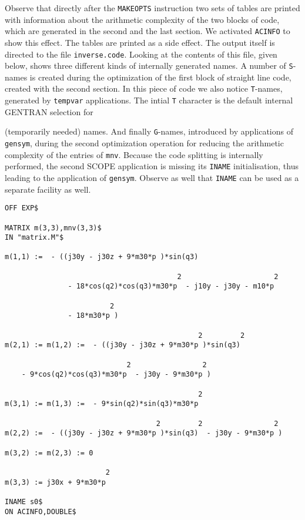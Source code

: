 Observe that directly after the {\tt MAKEOPTS} instruction two sets of tables
are printed with information about the arithmetic complexity of the two blocks 
of code, which are generated in the second and the last section.  We 
activated {\tt ACINFO} to show this effect.  The tables are printed as 
a side effect. The output itself is directed to the file {\tt inverse.code}.
Looking at the contents of this file, given below, shows three different 
kinds of internally generated names. A number of {\tt S}-names is created 
during the optimization of the first block of straight line code, created with
the second section. In this piece of code we also notice {\tt T}-names,
generated by {\tt tempvar} applications. The intial {\tt T} character is the
default internal GENTRAN selection for {(temporarily needed) names.
And finally {\tt G}-names, introduced by
applications of {\tt gensym}, during the second optimization operation for
reducing the arithmetic complexity of the entries of {\tt mnv}. Because the
code splitting is internally performed, the second SCOPE application 
is missing its {\tt INAME} initialisation, thus leading to the application of
{\tt gensym}. Observe as well that {\tt INAME} can be used as a separate 
facility as well.  
{\small
\begin{verbatim}
OFF EXP$

MATRIX m(3,3),mnv(3,3)$
IN "matrix.M"$

m(1,1) :=  - ((j30y - j30z + 9*m30*p )*sin(q3)

                                         2                      2
               - 18*cos(q2)*cos(q3)*m30*p  - j10y - j30y - m10*p

                         2
               - 18*m30*p )

                                              2         2
m(2,1) := m(1,2) :=  - ((j30y - j30z + 9*m30*p )*sin(q3)

                             2                 2
    - 9*cos(q2)*cos(q3)*m30*p  - j30y - 9*m30*p )

                                              2
m(3,1) := m(1,3) :=  - 9*sin(q2)*sin(q3)*m30*p

                                    2         2                 2
m(2,2) :=  - ((j30y - j30z + 9*m30*p )*sin(q3)  - j30y - 9*m30*p )

m(3,2) := m(2,3) := 0

                        2
m(3,3) := j30x + 9*m30*p

INAME s0$
ON ACINFO,DOUBLE$


\end{verbatim}}}
